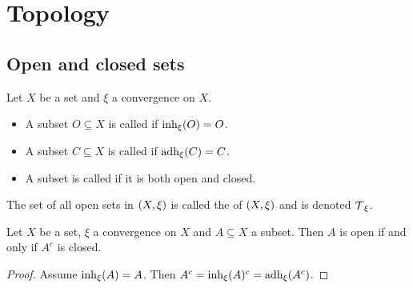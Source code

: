 \section{Topology}
\subsection{Open and closed sets}
\begin{definition}
Let $X$ be a set and $\xi$ a convergence on $X$.
\begin{itemize}
    \item A subset $O \subseteq X$ is called  if $\operatorname{inh}_\xi(O) = O$.
    \item A subset $C \subseteq X$ is called  if $\operatorname{adh}_\xi(C) = C$.
    \item A subset is called  if it is both open and closed.
\end{itemize}
The set of all open sets in $\sSet{X,\xi}$ is called the  of $\sSet{X,\xi}$ and is denoted $\operatorname{\mathcal{T}}_\xi$.
\end{definition}

\begin{lemma} \label{openClosedComplement}
Let $X$ be a set, $\xi$ a convergence on $X$ and $A\subseteq X$ a subset. Then $A$ is open \textup{if and only if} $A^c$ is closed.
\end{lemma}
\begin{proof}
Assume $\operatorname{inh}_\xi(A) = A$. Then $A^c = \operatorname{inh}_\xi(A)^c = \operatorname{adh}_\xi(A^c)$.
\end{proof}


